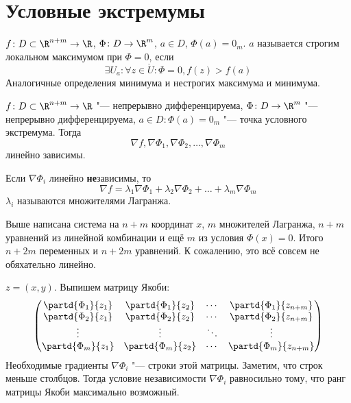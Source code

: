 \section{Условные экстремумы}

\begin{Def}
	$f\colon D \subset \R^{n+m} \to \R$, $\Phi\colon D \to \R^m$, $a \in D$, $\Phi(a) = 0_m$.
	$a$ называется строгим локальном максимумом при $\Phi = 0$, если
	\[ \exists U_a\colon \forall z \in \mathring U\colon \Phi = 0, f(z) > f(a) \]
	Аналогичные определения минимума и нестрогих максимума и минимума.
\end{Def}

\begin{theorem}
	$f\colon D \subset \R^{n+m} \to \R$ "--- непрерывно дифференцируема,
	$\Phi\colon D \to \R^m$ "--- непрерывно дифференцируема,
	$a \in D\colon \Phi(a) = 0_m$ "--- точка условного экстремума.
	Тогда
	\[ \nabla f, \nabla \Phi_1, \nabla \Phi_2, \dots, \nabla \Phi_m \]
	линейно зависимы.
\end{theorem}
\begin{Def}
	Если $\nabla \Phi_i$ линейно \textbf{не}зависимы, то
	\[ \nabla f = \lambda_1 \nabla \Phi_1 + \lambda_2 \nabla \Phi_2 + \dots + \lambda_m \nabla \Phi_m \]
	$\lambda_i$ называются множителями Лагранжа.
\end{Def}
\begin{Rem}
	Выше написана система на $n + m$ координат $x$, $m$ множителей Лагранжа,
	$n + m$ уравнений из линейной комбинации и ещё $m$ из условия $\Phi(x) = 0$.
	Итого $n + 2m$ переменных и $n + 2m$ уравнений.
	К сожалению, это всё совсем не обяхательно линейно.
\end{Rem}
\begin{Rem}
	$z = (x, y)$. Выпишем матрицу Якоби:
	\[
		\begin{pmatrix}
			\partd{\Phi_1}{z_1} & \partd{\Phi_1}{z_2} & \cdots & \partd{\Phi_1}{z_{n+m}} \\
			\partd{\Phi_2}{z_1} & \partd{\Phi_2}{z_2} & \cdots & \partd{\Phi_2}{z_{n+m}} \\
			\vdots & \vdots & \ddots & \vdots \\
			\partd{\Phi_m}{z_1} & \partd{\Phi_m}{z_2} & \cdots & \partd{\Phi_m}{z_{n+m}} \\
		\end{pmatrix}
	\]
	Необходимые градиенты $\nabla \Phi_i$ "--- строки этой матрицы.
	Заметим, что строк меньше столбцов.
	Тогда условие независимости $\nabla \Phi_i$ равносильно тому, что ранг матрицы Якоби максимально возможный.
\end{Rem}

